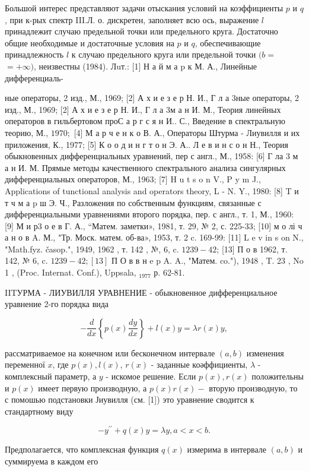 \documentclass[10pt]{article}
\begin{document}
Большой интерес представляют задачи отыскания условий на коэффициенты $p$ и $q$, при к-рых спектр III.Л. о. дискретен, заполняет всю ось, выражение $l$ принадлежит случаю предельной точки или предельного круга. Достаточно общие необходимые и достаточные условия на $p$ и $q$, обеспечивающие принадлежность $l$ к случаю предельного круга или предельной точки $(b=$ $=+\infty)$, неизвестны (1984). Лuт.: [1] Н а й м а $\mathrm{p}$ к М. А., Линейные дифференциаль-

ные операторы, 2 изд., М., 1969; [2] А х и е з е р Н. И., Г л а 3ные операторы, 2 изд., М., 1969; [2] А х и е з е р Н. И., Г л а 3м а н И. М., Теория линейных операторов в гильбертовом проС а р г с я н И.. С., Введение в спектральную теорию, М., $1970 ;$ [4] М а р ч е н к о В. А., Операторы Штурма - Лиувилля и их приложения, К., 1977; [5] К о о д и н г т о н Э. А.. Л е в и н с о н Н., Теория обыкновенных дифференциальных уравнений, пер с англ., М., 1958: [6] Г ла 3 м а н И. М. Прямые методы качественного спектрального анализа сингулярных дифференциальных операторов, М., 1963; [7] H u t s o n V., P y m J., Applications of tunctional analysis and operators theory, L - N. Y., 1980: [8] T и т ч м а p ш Э. Ч., Разложения по собственным функциям, связанные с дифференциальными уравнениями второго порядка, пер. с англ., т. 1, М., 1960: [9] М и р3 о е в Г. А., “Матем. заметки», 1981, т. 29, № 2, с. 225-33; [10] м о лі ч а н о в A. М., "Тр. Моск. матем. об-ва», 1953, т. 2 c. 169-99: [11] L e v in s on N., "Math.fyz. časop.", 1949, 1962 , т. 142 , №, 6, c. $1239-42$; [13] П о в 1962, т. 142, № 6, c. $1239-42 ;[13]$ П О в в н e p A. A., "Матем. co."), 1948 , T. 23 , No 1 , (Proc. Internat. Conf.), Uppsala, ${ }_{1977}$ р. 62-81.



IITУРМА - ЛИУВИЛЛЯ УРАВНЕНИЕ - обыкновенное дифференциальное уравнение 2-го порядка вида



\[

-\frac{d}{d x}\left\{p(x) \frac{d y}{d x}\right\}+l(x) y=\lambda r(x) y,

\]



рассматриваемое на конечном или бесконечном интервале $(a, b)$ изменения переменної $x$, где $p(x), l(x)$, $r(x)$ - заданные коәффициенты, $\lambda$ - комплексный параметр, а $y$ - искомое решение. Если $p(x), r(x)$ положительны и $p(x)$ имеет первую производную, а $p(x) r(x)-$ вторую производную, то с помошью подстановки Јиувилля (см. [1]) это уравнение сводится к стандартному виду



\[

-y^{\prime \prime}+q(x) y=\lambda y, a<x<b .

\]



Предполагается, что комплексная функция $q(x)$ измерима в интервале $(a, b)$ и суммируема в каждом его
\end{document}
